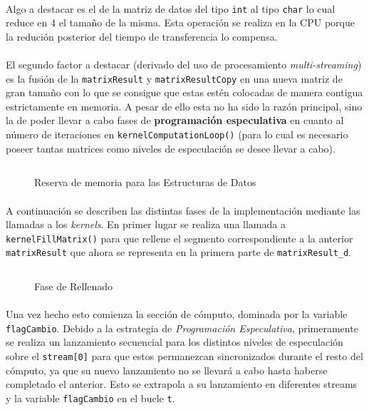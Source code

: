 \documentclass[10pt, a4paper,spanish]{article}
\begin{document}
		\paragraph{}
		Algo a destacar es el  de la matriz de datos del tipo \texttt{int} al tipo \texttt{char} lo cual reduce en 4 el tamaño de la misma. Esta operación se realiza en la CPU porque la redución posterior del tiempo de transferencia lo compensa.

		\paragraph{}
		El segundo factor a destacar (derivado del uso de procesamiento \emph{multi-streaming}) es la fusión de la \texttt{matrixResult} y \texttt{matrixResultCopy} en una nueva matriz de gran tamaño con lo que se consigue que estas estén colocadas de manera contigua estrictamente en memoria. A pesar de ello esta no ha sido la razón principal, sino la de poder llevar a cabo fases de \textbf{programación especulativa} en cuanto al número de iteraciones en \texttt{kernelComputationLoop()} (para lo cual es necesario poseer tantas matrices como niveles de especulación se desee llevar a cabo).

		\begin{figure}[h]
			\centering
			\inputminted{cuda}{./code/malloc.cu}
			\caption{Reserva de memoria para las Estructuras de Datos}
			\label{code:malloc}
		\end{figure}

		\paragraph{}
		A continuación se describen las distintas fases de la implementación mediante las llamadas a los \emph{kernels}. En primer lugar se realiza una llamada a \texttt{kernelFillMatrix()} para que rellene el segmento correspondiente a la anterior \texttt{matrixResult} que ahora se representa en la primera parte de \texttt{matrixResult\_d}.

		\begin{figure}[h]
			\centering
			\inputminted{cuda}{./code/fill.cu}
			\caption{Fase de Rellenado}
			\label{code:fill}
		\end{figure}

		\paragraph{}
		Una vez hecho esto comienza la sección de cómputo, dominada por la variable \texttt{flagCambio}. Debido a la estrategia de \emph{Programación Especulativa}, primeramente se realiza un lanzamiento secuencial para los distintos niveles de especulación sobre el \texttt{stream[0]} para que estos permanezcan sincronizados durante el resto del cómputo, ya que su nuevo lanzamiento no se llevará a cabo hasta haberse completado el anterior. Esto se extrapola a su lanzamiento en diferentes streams y la variable \texttt{flagCambio} en el bucle \texttt{t}.
\end{document}

